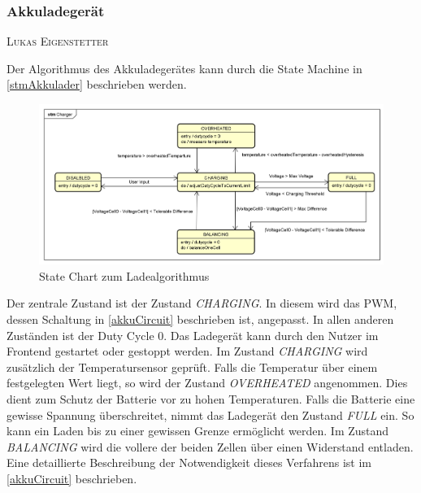 \documentclass[12pt,a4paper,bibliography=totocnumbered,listof=totocnumbered]{article}
\makeatletter
\newcommand{\chapterauthor}[1]{%
  {\parindent0pt\vspace*{-5pt}%
  \linespread{1.1}\small\scshape#1%
  \par\nobreak\vspace*{3pt}}
  \@afterheading%
}
\makeatother
\begin{document}

\subsubsection{Akkuladegerät}\label{Akkuladegerät}
\chapterauthor{Lukas Eigenstetter}
Der Algorithmus des Akkuladegerätes kann durch die State Machine in \autoref{stmAkkulader} beschrieben werden.
\begin{figure}[htpb] %
    \centering
    \includegraphics[width=\textwidth,keepaspectratio=true]{pics/chargerStm.png}
    \caption{State Chart zum Ladealgorithmus}
    \label{stmAkkulader}
\end{figure}
Der zentrale Zustand ist der Zustand \emph{CHARGING}.
In diesem wird das PWM, dessen Schaltung in \autoref{akkuCircuit} beschrieben ist, angepasst.
In allen anderen Zuständen ist der Duty Cycle 0.
Das Ladegerät kann durch den Nutzer im Frontend gestartet oder gestoppt werden.
Im Zustand \emph{CHARGING} wird zusätzlich der Temperatursensor geprüft.
Falls die Temperatur über einem festgelegten Wert liegt, so wird der Zustand \emph{OVERHEATED} angenommen.
Dies dient zum Schutz der Batterie vor zu hohen Temperaturen.  \autocite[S. 53]{chargerBuch}
Falls die Batterie eine gewisse Spannung überschreitet, nimmt das Ladegerät den Zustand \emph{FULL} ein.
So kann ein Laden bis zu einer gewissen Grenze ermöglicht werden.
Im Zustand \emph{BALANCING} wird die vollere der beiden Zellen über einen Widerstand entladen.
Eine detaillierte Beschreibung der Notwendigkeit dieses Verfahrens ist im \autoref{akkuCircuit} beschrieben.
\end{document}
